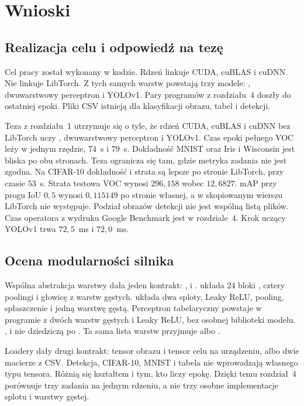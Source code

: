 \chapter{Wnioski}

\section{Realizacja celu i odpowiedź na tezę}

Cel pracy został wykonany w kodzie. Rdzeń  linkuje CUDA, cuBLAS i cuDNN. Nie linkuje LibTorch. Z tych samych warstw powstają trzy modele: , dwuwarstwowy perceptron i YOLOv1. Pary programów z rozdziału~4 doszły do ostatniej epoki. Pliki CSV istnieją dla klasyfikacji obrazu, tabel i detekcji.

Teza z rozdziału~1 utrzymuje się o tyle, że rdzeń CUDA, cuBLAS i cuDNN bez LibTorch uczy , dwuwarstwowy perceptron i YOLOv1. Czas epoki pełnego VOC leży w jednym rzędzie, \(74\)~s i \(79\)~s. Dokładność MNIST oraz Iris i Wisconsin jest bliska po obu stronach. Teza ogranicza się tam, gdzie metryka zadania nie jest zgodna. Na CIFAR-10 dokładność i strata są lepsze po stronie LibTorch, przy czasie \(53\)~s. Strata testowa VOC wynosi \(296{,}158\) wobec \(12{,}6827\). mAP przy progu IoU \(0{,}5\) wynosi \(0{,}115149\) po stronie własnej, a w skopiowanym wierszu LibTorch nie występuje. Podział obrazów detekcji nie jest wspólną listą plików. Czas operatora z wydruku Google Benchmark jest w rozdziale~4. Krok uczący YOLOv1 trwa \(72{,}5\)~ms i \(72{,}0\)~ms.

\section{Ocena modularności silnika}

Wspólna abstrakcja warstwy dała jeden kontrakt: ,  i .  układa \(24\) bloki , cztery poolingi i głowicę z warstw gęstych.  układa dwa sploty, Leaky ReLU, pooling, spłaszczenie i jedną warstwę gęstą. Perceptron tabelaryczny powstaje w programie z dwóch warstw gęstych i Leaky ReLU, bez osobnej biblioteki modelu. ,  i  nie dziedziczą po . Ta sama lista warstw przyjmuje  albo .

Loadery dały drugi kontrakt: tensor obrazu i tensor celu na urządzeniu, albo dwie macierze z CSV. Detekcja, CIFAR-10, MNIST i tabela nie wprowadzają własnego typu tensora. Różnią się kształtem i tym, kto liczy epokę. Dzięki temu rozdział~4 porównuje trzy zadania na jednym rdzeniu, a nie trzy osobne implementacje splotu i warstwy gęstej.

